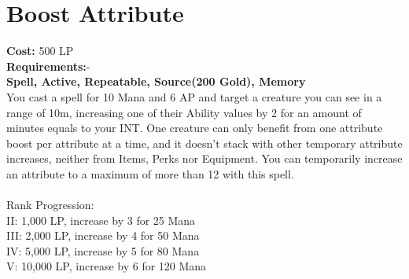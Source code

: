 \section{Boost Attribute}\label{spell:boostAttribute}
\textbf{Cost:} 500 LP\\
\textbf{Requirements:}-\\
\textbf{Spell, Active, Repeatable, Source(200 Gold), Memory}\\
You cast a spell for 10 Mana and 6 AP and target a creature you can see in a range of 10m, increasing one of their Ability values by 2 for an amount of minutes equals to your INT.
One creature can only benefit from one attribute boost per attribute at a time, and it doesn't stack with other temporary attribute increases, neither from Items, Perks nor Equipment.
You can temporarily increase an attribute to a maximum of more than 12 with this spell.\\
\\
Rank Progression:\\
II: 1,000 LP, increase by 3 for 25 Mana\\
III: 2,000 LP, increase by 4 for 50 Mana\\
IV: 5,000 LP, increase by 5 for 80 Mana\\
V: 10,000 LP, increase by 6 for 120 Mana\\